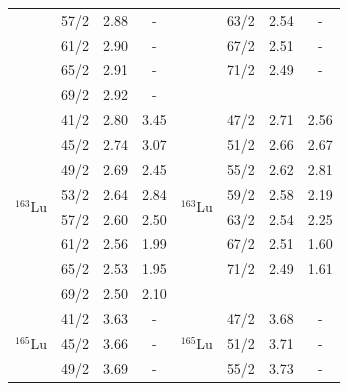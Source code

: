 \begin{table}
\begin{tabular}{|c|c|c|c|c|ccc|}
    \multicolumn{1}{|c|}{} & 57/2 & \multicolumn{1}{c|}{2.88} & - & \multicolumn{1}{c|}{} & \multicolumn{1}{c|}{63/2} & \multicolumn{1}{c|}{2.54} & - \\ \cline{2-4} \cline{6-8} 
    \multicolumn{1}{|c|}{} & 61/2 & \multicolumn{1}{c|}{2.90} & - & \multicolumn{1}{c|}{} & \multicolumn{1}{c|}{67/2} & \multicolumn{1}{c|}{2.51} & - \\ \cline{2-4} \cline{6-8} 
    \multicolumn{1}{|c|}{} & 65/2 & \multicolumn{1}{c|}{2.91} & - & \multicolumn{1}{c|}{} & \multicolumn{1}{c|}{71/2} & \multicolumn{1}{c|}{2.49} & - \\ \cline{2-4} \cline{6-8} 
    \multicolumn{1}{|c|}{} & 69/2 & \multicolumn{1}{c|}{2.92} & - & \multicolumn{1}{c|}{} & \multicolumn{3}{c|}{} \\ \hline
    \multirow{8}{*}{$^{163}$Lu} & 41/2 & 2.80 & 3.45 & \multirow{8}{*}{$^{163}$Lu} & \multicolumn{1}{c|}{47/2} & \multicolumn{1}{c|}{2.71} & 2.56 \\ \cline{2-4} \cline{6-8} 
    & 45/2 & 2.74 & 3.07 &  & \multicolumn{1}{c|}{51/2} & \multicolumn{1}{c|}{2.66} & 2.67 \\ \cline{2-4} \cline{6-8} 
    & 49/2 & 2.69 & 2.45 &  & \multicolumn{1}{c|}{55/2} & \multicolumn{1}{c|}{2.62} & 2.81 \\ \cline{2-4} \cline{6-8} 
    & 53/2 & 2.64 & 2.84 &  & \multicolumn{1}{c|}{59/2} & \multicolumn{1}{c|}{2.58} & 2.19 \\ \cline{2-4} \cline{6-8} 
    & 57/2 & 2.60 & 2.50 &  & \multicolumn{1}{c|}{63/2} & \multicolumn{1}{c|}{2.54} & 2.25 \\ \cline{2-4} \cline{6-8} 
    & 61/2 & 2.56 & 1.99 &  & \multicolumn{1}{c|}{67/2} & \multicolumn{1}{c|}{2.51} & 1.60 \\ \cline{2-4} \cline{6-8} 
    & 65/2 & 2.53 & 1.95 &  & \multicolumn{1}{c|}{71/2} & \multicolumn{1}{c|}{2.49} & 1.61 \\ \cline{2-4} \cline{6-8} 
    & 69/2 & 2.50 & 2.10 &  & \multicolumn{3}{c|}{}                                        \\ \hline
    \multirow{8}{*}{$^{165}$Lu} & 41/2 & 3.63 & - & \multirow{8}{*}{$^{165}$Lu} & \multicolumn{1}{c|}{47/2} & \multicolumn{1}{c|}{3.68} & - \\ \cline{2-4} \cline{6-8} 
    & 45/2 & 3.66 & - &  & \multicolumn{1}{c|}{51/2} & \multicolumn{1}{c|}{3.71} & - \\ \cline{2-4} \cline{6-8} 
    & 49/2 & 3.69 & - &  & \multicolumn{1}{c|}{55/2} & \multicolumn{1}{c|}{3.73} & - \\ \cline{2-4} \cline{6-8} 

\end{tabular}
\end{table}
